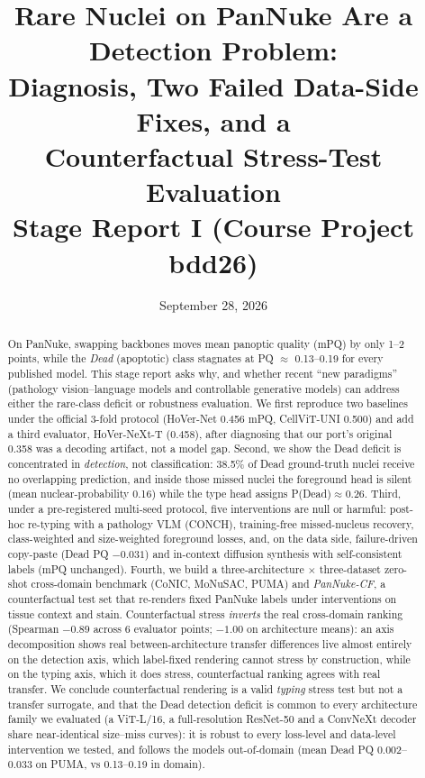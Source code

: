 \documentclass[11pt]{article}
\title{\bfseries Rare Nuclei on PanNuke Are a Detection Problem:\\
Diagnosis, Two Failed Data-Side Fixes, and a\\ Counterfactual Stress-Test Evaluation\\[6pt]
\large Stage Report I (Course Project bdd26)}
\author{}
\date{September 28, 2026}
\begin{document}
\maketitle


\begin{abstract}
On PanNuke, swapping backbones moves mean panoptic quality (mPQ) by only 1--2 points, while the
\emph{Dead} (apoptotic) class stagnates at PQ $\approx$ 0.13--0.19 for every published model. This
stage report asks why, and whether recent ``new paradigms'' (pathology vision--language models
and controllable generative models) can address either the rare-class deficit or robustness
evaluation. We first reproduce two baselines under the official 3-fold protocol (HoVer-Net
0.456 mPQ, CellViT-UNI 0.500) and add a third evaluator, HoVer-NeXt-T (0.458), after diagnosing
that our port's original 0.358 was a decoding artifact, not a model gap. Second, we show the Dead
deficit is concentrated in \emph{detection}, not classification: 38.5\% of Dead ground-truth
nuclei receive no overlapping prediction, and inside those missed nuclei the foreground head is
silent (mean nuclear-probability 0.16) while the type head assigns P(Dead)$\approx$0.26. Third,
under a pre-registered multi-seed protocol, five interventions are null or harmful: post-hoc
re-typing with a pathology VLM (CONCH), training-free missed-nucleus recovery, class-weighted and
size-weighted foreground losses, and, on the data side, failure-driven copy-paste (Dead PQ
$-0.031$) and in-context diffusion synthesis with self-consistent labels (mPQ unchanged).
Fourth, we build a three-architecture $\times$ three-dataset zero-shot cross-domain benchmark
(CoNIC, MoNuSAC, PUMA) and \emph{PanNuke-CF}, a counterfactual test set that re-renders fixed
PanNuke labels under interventions on tissue context and stain. Counterfactual stress
\emph{inverts} the real cross-domain ranking (Spearman $-0.89$ across 6 evaluator points;
$-1.00$ on architecture means): an axis decomposition shows real between-architecture transfer
differences live almost entirely on the detection axis, which label-fixed rendering cannot
stress by construction, while on the typing axis, which it does stress, counterfactual ranking
agrees with real transfer. We conclude counterfactual rendering is a valid \emph{typing} stress
test but not a transfer surrogate, and that the Dead detection deficit is common to every
architecture family we evaluated (a ViT-L/16, a full-resolution ResNet-50 and a ConvNeXt
decoder share near-identical size--miss curves): it is robust to every loss-level and
data-level intervention we tested, and follows the models out-of-domain (mean Dead PQ
0.002--0.033 on PUMA, vs 0.13--0.19 in domain).
\end{abstract}
\end{document}
